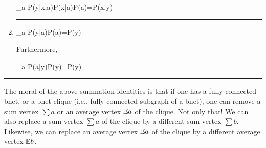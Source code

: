 \begin{enumerate}
\beq
\sum_a P(y|x,a)P(x|a)P(a)=P(x,y)
\eeq

\beq
{}
\label{eq-med-sum-ee}
\eeq

\hrule

\item
\beq
\sum_a P(y|a)P(a)=P(y)
\eeq

\beq
{}
\label{eq-diff-priors}
\eeq
Furthermore,

\beq
\sum_a P(a|y)P(y)=P(y)
\eeq

\beq
{}
\label{eq-diff-priors-ee}
\eeq

\end{enumerate}
\hrule

The moral of the above summation identities is that
if one has a fully connected bnet, or a bnet clique
(i.e., fully connected subgraph of a bnet),
one can remove a sum vertex $\sum a$ or an average
vertex ${ \mathbb{E}} a$ of the clique. Not only that! We can also 
replace a sum vertex $\sum a$  of the clique by a different  sum vertex $\sum b$. Likewise, we can replace
an average vertex ${ \mathbb{E}} a$  of the clique by a different  average vertex ${ \mathbb{E}} b$.

%
%
%




